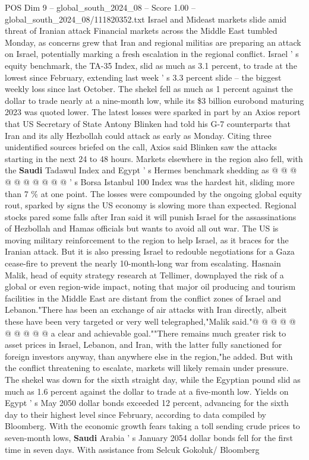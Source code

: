 \begin{textsample}{POS Dim 9 – global\_south\_2024\_08 – Score 1.00 – global\_south\_2024\_08/111820352.txt}  \label{ex:f9_pos_064}
Israel and Mideast markets slide amid threat of Iranian attack Financial markets across the Middle East tumbled Monday, as concerns grew that Iran and regional militias are preparing an attack on Israel, potentially marking a fresh escalation in the regional conflict.
Israel ' s equity benchmark, the TA-35 Index, slid as much as 3.1 percent, to trade at the lowest since February, extending last week ' s 3.3 percent slide -- the biggest weekly loss since last October.
The shekel fell as much as 1 percent against the dollar to trade nearly at a nine-month low, while its \$3 billion eurobond maturing 2023 was quoted lower.
The latest losses were sparked in part by an Axios report that US Secretary of State Antony Blinken had told his G-7 counterparts that Iran and its ally Hezbollah could attack as early as Monday.
Citing three unidentified sources briefed on the call, Axios said Blinken saw the attacks starting in the next 24 to 48 hours.
Markets elsewhere in the region also fell, with the \textbf{Saudi} Tadawul Index and Egypt ' s Hermes benchmark shedding as @ @ @ @ @ @ @ @ @ @ ' s Borsa Istanbul 100 Index was the hardest hit, sliding more than 7 \% at one point.
The losses were compounded by the ongoing global equity rout, sparked by signs the US economy is slowing more than expected.
Regional stocks pared some falls after Iran said it will punish Israel for the assassinations of Hezbollah and Hamas officials but wants to avoid all out war.
The US is moving military reinforcement to the region to help Israel, as it braces for the Iranian attack.
But it is also pressing Israel to redouble negotiations for a Gaza cease-fire to prevent the nearly 10-month-long war from escalating.
Hasnain Malik, head of equity strategy research at Tellimer, downplayed the risk of a global or even region-wide impact, noting that major oil producing and tourism facilities in the Middle East are distant from the conflict zones of Israel and Lebanon."There has been an exchange of air attacks with Iran directly, albeit these have been very targeted or very well telegraphed,"Malik said."@ @ @ @ @ @ @ @ @ @ a clear and achievable goal.""There remains much greater risk to asset prices in Israel, Lebanon, and Iran, with the latter fully sanctioned for foreign investors anyway, than anywhere else in the region,"he added.
But with the conflict threatening to escalate, markets will likely remain under pressure.
The shekel was down for the sixth straight day, while the Egyptian pound slid as much as 1.6 percent against the dollar to trade at a five-month low.
Yields on Egypt ' s May 2050 dollar bonds exceeded 12 percent, advancing for the sixth day to their highest level since February, according to data compiled by Bloomberg.
With the economic growth fears taking a toll sending crude prices to seven-month lows, \textbf{Saudi} Arabia ' s January 2054 dollar bonds fell for the first time in seven days.
With assistance from Selcuk Gokoluk/ Bloomberg

\end{textsample}
